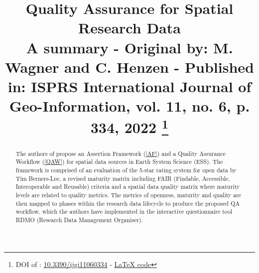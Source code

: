 \documentclass[conference]{IEEEtran}
\begin{document}
\title{Quality Assurance for Spatial Research Data\\
{\footnotesize A summary - Original by: M. Wagner and C. Henzen - Published in: ISPRS International Journal of Geo-Information, vol. 11, no. 6, p. 334, 2022 \cite{sjr}}
\thanks{DOI of \cite{wagner2022quality}: \href{https://doi.org/10.3390/ijgi11060334}{10.3390/ijgi11060334} - \href{https://github.com/Anything-Code/quality-assurance-for-spatial-research-data-a-summary/blob/master/summary.tex}{LaTeX code}}
}

\author{
\and
{}
\and
{}
}

\maketitle

\begin{abstract}
    The authors of \cite{wagner2022quality} propose an Assertion Framework (\ref{AF}) and a Quality Assurance Workflow (\ref{QAW}) for spatial data sources in Earth System Science (ESS). The framework is comprised of an evaluation of the 5-star rating system for open data by Tim Berners-Lee, a revised maturity matrix including FAIR (Findable, Accessible, Interoperable and Reusable) criteria and a spatial data quality matrix where maturity levels are related to quality metrics. The metrics of openness, maturity and quality are then mapped to phases within the research data lifecycle to produce the proposed QA workflow, which the authors have implemented in the interactive questionnaire tool RDMO (Research Data Management Organiser).
\end{abstract}
\end{document}
